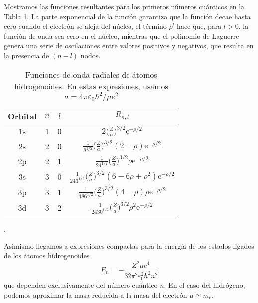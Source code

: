 Mostramos las 
funciones resultantes para los primeros números cuánticos en
la Tabla \ref{tb:radial_hydrogenoid}. La parte exponencial de
la función garantiza que la función decae hasta cero cuando
el electrón se aleja del núcleo, el término $\rho^l$ hace
que, para $l>0$, la función de onda sea cero en el núcleo, 
mientras que el polinomio de Laguerre genera una serie de 
oscilaciones entre valores positivos y negativos, que resulta
en la presencia de $(n-l)$ nodos. 
\begin{table}[b!]
    \centering
    \begin{tabular}{|c|c|c|c|}
    \hline
         Orbital & $n$  & $l$ &$R_{n,l}$ \\
    \hline
    \hline
         1s & 1 & 0 & 
         $2\bigg(\frac{Z}{a}\bigg)^{3/2}\mathrm{e}^{-\rho/2}$ \\
         2s & 2 & 0 & 
         $\frac{1}{8^{1/2}}\bigg(\frac{Z}{a}\bigg)^{3/2}(2-\rho) \mathrm{e}^{-\rho/2}$\\
         2p & 2 & 1 & 
         $\frac{1}{24^{1/2}}\bigg(\frac{Z}{a}\bigg)^{3/2}\rho \mathrm{e}^{-\rho/2}$\\
         3s & 3 & 0 & 
         $\frac{1}{243^{1/2}}\bigg(\frac{Z}{a})^{3/2}(6-6\rho+\rho^2)\mathrm{e}^{-\rho/2}$ \\
         3p & 3 & 1 &
         $\frac{1}{486^{1/2}}\bigg(\frac{Z}{a}\bigg)^{3/2}(4-\rho)\rho \mathrm{e}^{-\rho/2}$ \\
         3d & 3 & 2 & $\frac{1}{2430^{1/2}}\bigg(\frac{Z}{a}\bigg)^{3/2}\rho^2\mathrm{e}^{-\rho/2}$ \\
    \hline
    \end{tabular}
    \caption{Funciones de onda radiales de átomos hidrogenoides. En estas expresiones, 
    usamos $a=4 \pi \varepsilon_0\hbar^2/\mu e^2$}. %
    \label{tb:radial_hydrogenoid}
\end{table}



Asimismo llegamos a expresiones compactas para la energía de 
los estados ligados de los átomos hidrogenoides
\begin{equation}
    E_n=-\frac{Z^2\mu e^4}{32\pi^2\varepsilon_0^2\hbar^2 n^2}
    \label{eq:Eh}
\end{equation}
que dependen exclusivamente del número cuántico $n$. 
En el caso del hidrógeno, podemos aproximar la masa reducida
a la masa del electrón $\mu\simeq m_e$. 

